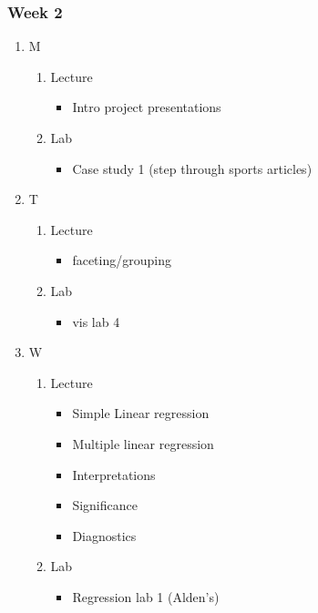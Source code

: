 \documentclass{article}
\begin{document}
\subsubsection{Week 2}
\label{sec:orgfebe8c6}
\begin{enumerate}
\item M
\label{sec:orgcd06170}
\begin{enumerate}
\item Lecture
\label{sec:org05d93b0}
\begin{itemize}
\item Intro project presentations
\end{itemize}
\item Lab
\label{sec:orgacaa997}
\begin{itemize}
\item Case study 1 (step through sports articles)
\end{itemize}
\end{enumerate}
\item T
\label{sec:org82c452e}
\begin{enumerate}
\item Lecture
\label{sec:orgaa39fff}
\begin{itemize}
\item faceting/grouping
\end{itemize}
\item Lab
\label{sec:org9f348a5}
\begin{itemize}
\item vis lab 4
\end{itemize}
\end{enumerate}
\item W
\label{sec:org9a36b8a}
\begin{enumerate}
\item Lecture
\label{sec:orgd7829e5}
\begin{itemize}
\item Simple Linear regression
\item Multiple linear regression
\item Interpretations
\item Significance
\item Diagnostics
\end{itemize}
\item Lab
\label{sec:org25f365f}
\begin{itemize}
\item Regression lab 1 (Alden's)
\end{itemize}
\end{enumerate}

\end{enumerate}
\end{document}
